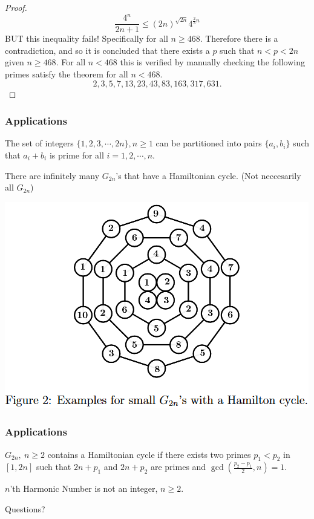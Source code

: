 \documentclass{beamer}
\begin{document}
\begin{frame}
\begin{proof}
$$\frac{4^n}{2n+1} \leq (2n)^{\sqrt{2n}}4^{\frac{2}{3}n} $$
BUT this inequality fails! Specifically for all $n \geq 468$. Therefore there is a contradiction, and so it is concluded that  there exists a $p$ such that $n < p < 2n$ given $n \geq 468.$ For all $n < 468$ this is verified by manually checking  the following primes satisfy the theorem for all $n < 468.$
$$2,3,5,7,13,23,43,83,163,317,631.$$
\end{proof}
\end{frame}

\begin{frame}
\frametitle{Applications}
\begin{theorem}[1.1]\normalfont 
The set of integers $\{1,2,3,\cdots,2n\}, n \geq 1$ can be partitioned into pairs $\{a_i, b_i \}$ such that $a_i + b_i$ is prime for all $i = 1,2,\cdots,n$.
\end{theorem}
\pause
\begin{theorem}[1.2]\normalfont 
There are infinitely many $G_{2n}$'s that have a Hamiltonian cycle. (Not neccesarily all $G_{2n}$)
\end{theorem}
\begin{center}
\includegraphics[scale=.4]{g2n}
\end{center}
\end{frame}

\begin{frame}
\frametitle{Applications}
\begin{theorem}[1.3]\normalfont
$G_{2n}, \ n \geq 2$ contains a Hamiltonian cycle if there exists two primes $p_1 < p_2 $ in $[1,2n]$ such that $2n + p_1$ and $2n + p_2$ are primes and $\gcd{(\frac{p_2 - p_1}{2},n)} = 1.$
\end{theorem}
\pause
\begin{theorem}[2]\normalfont
$n$'th Harmonic Number is not an integer, $ n \geq 2$.
\end{theorem}
\end{frame}

\begin{frame}
\begin{center}
Questions?
\end{center}
\end{frame}
\end{document}
